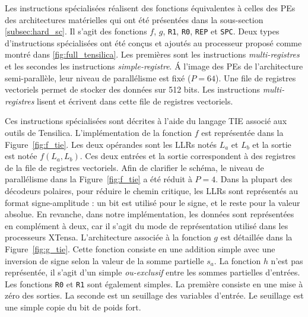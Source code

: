 Les instructions spécialisées réalisent des fonctions équivalentes à celles des PEs des architectures matérielles qui ont été présentées dans la sous-section \ref{subsec:hard_sc}. Il s'agit des fonctions $f$, $g$, \texttt{R1}, \texttt{R0}, \texttt{REP} et \texttt{SPC}. Deux types d'instructions spécialisées ont été conçus et ajoutés au processeur proposé comme montré dans \ref{fig:full_tensilica}. Les premières sont les instructions \textit{multi-registres} et les secondes les instructions \textit{simple-registre}. \'A l'image des PEs de l'architecture semi-parallèle, leur niveau de parallélisme est fixé ($P=64$). Une file de registres vectoriels permet de stocker des données sur 512 bits. Les instructions \textit{multi-registres} lisent et écrivent dans cette file de registres vectoriels.

Ces instructions spécialisées sont décrites à l'aide du langage TIE associé aux outils de Tensilica.
L'implémentation de la fonction $f$ est représentée dans la Figure~\ref{fig:f_tie}. Les deux opérandes sont les LLRs notés $L_a$ et $L_b$ et la sortie est notée $f(L_a,L_b)$. Ces deux entrées et la sortie correspondent à des registres de la file de registres vectoriels. Afin de clarifier le schéma, le niveau de parallélisme dans la Figure~\ref{fig:f_tie} a été réduit à $P=4$. Dans la plupart des décodeurs polaires, pour réduire le chemin critique, les LLRs sont représentés au format \og signe-amplitude \fg : un bit est utilisé pour le signe, et le reste pour la valeur absolue. En revanche, dans notre implémentation, les données sont représentées en complément à deux, car il s'agit du mode de représentation utilisé dans les processeurs XTensa.
L'architecture associée à la fonction $g$ est détaillée dans la Figure~\ref{fig:g_tie}. Cette fonction consiste en une addition simple avec une inversion de signe selon la valeur de la somme partielle $s_a$.
La fonction $h$ n'est pas représentée, il s'agit d'un simple \textit{ou-exclusif} entre les sommes partielles d'entrées. Les fonctions \texttt{R0} et \texttt{R1} sont également simples. La première consiste en une mise à zéro des sorties. La seconde est un seuillage des variables d'entrée. Le seuillage est une simple copie du bit de poids fort.
